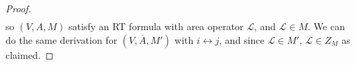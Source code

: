 \documentclass[12pt,a4paper]{article}
\numberwithin{equation}{section}
\newcommand{\ol}[1]{\overline{#1}}
\theoremstyle{definition}
\theoremstyle{theorem}
\theoremstyle{example}
\begin{document}
\begin{itemize}
\begin{proof}
\begin{equation}
\begin{aligned}
				\end{aligned}
			\end{equation}
			so $(V,A,M)$ satisfy an RT formula with area operator $\mathcal{L}$, and $\mathcal{L}\in M$. We can do the same derivation for $(V,\ol{A},M')$ with $i\leftrightarrow j$, and since $\mathcal{L}\in M'$, $\mathcal{L}\in Z_{M}$ as claimed.
		\end{proof}
	\end{itemize}
\end{document}
